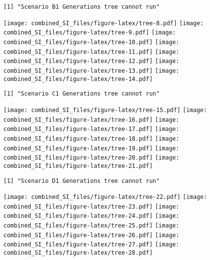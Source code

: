 \documentclass[
]{article}
\begin{document}
\begin{verbatim}
[1] "Scenario B1 Generations tree cannot run"
\end{verbatim}

\texttt{[image: combined\_SI\_files/figure-latex/tree-8.pdf]}
\texttt{[image: combined\_SI\_files/figure-latex/tree-9.pdf]}
\texttt{[image: combined\_SI\_files/figure-latex/tree-10.pdf]}
\texttt{[image: combined\_SI\_files/figure-latex/tree-11.pdf]}
\texttt{[image: combined\_SI\_files/figure-latex/tree-12.pdf]}
\texttt{[image: combined\_SI\_files/figure-latex/tree-13.pdf]}
\texttt{[image: combined\_SI\_files/figure-latex/tree-14.pdf]}

\begin{verbatim}
[1] "Scenario C1 Generations tree cannot run"
\end{verbatim}

\texttt{[image: combined\_SI\_files/figure-latex/tree-15.pdf]}
\texttt{[image: combined\_SI\_files/figure-latex/tree-16.pdf]}
\texttt{[image: combined\_SI\_files/figure-latex/tree-17.pdf]}
\texttt{[image: combined\_SI\_files/figure-latex/tree-18.pdf]}
\texttt{[image: combined\_SI\_files/figure-latex/tree-19.pdf]}
\texttt{[image: combined\_SI\_files/figure-latex/tree-20.pdf]}
\texttt{[image: combined\_SI\_files/figure-latex/tree-21.pdf]}

\begin{verbatim}
[1] "Scenario D1 Generations tree cannot run"
\end{verbatim}

\texttt{[image: combined\_SI\_files/figure-latex/tree-22.pdf]}
\texttt{[image: combined\_SI\_files/figure-latex/tree-23.pdf]}
\texttt{[image: combined\_SI\_files/figure-latex/tree-24.pdf]}
\texttt{[image: combined\_SI\_files/figure-latex/tree-25.pdf]}
\texttt{[image: combined\_SI\_files/figure-latex/tree-26.pdf]}
\texttt{[image: combined\_SI\_files/figure-latex/tree-27.pdf]}
\texttt{[image: combined\_SI\_files/figure-latex/tree-28.pdf]}

\pagebreak
\end{document}
